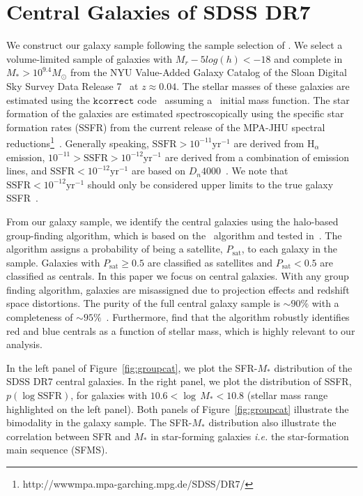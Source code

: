 \documentclass[12pt, letterpaper, preprint]{aastex}
\begin{document}
\section{Central Galaxies of SDSS DR7} \label{sec:sdss}
We construct our galaxy sample following the sample selection of \cite{tinker2011}. 
We select a volume-limited sample of galaxies with $M_r −5 log(h) < −18$ and complete in
$M_* > 10^{9.4} M_\odot$ from the NYU Value-Added Galaxy Catalog \citep[VAGC;][]{blanton2005}
of the Sloan Digital Sky Survey Data Release 7~\citep[SDSS DR7;][]{abazajian2009} at 
$z \approx 0.04$. The stellar masses of these galaxies are estimated using the
$\mathtt{kcorrect}$ code~\citep{blanton2007} assuming a~\cite{chabrier2003} initial
mass function. The star formation of the galaxies are estimated spectroscopically using the
specific star formation rates (SSFR) from the current release of the MPA-JHU spectral 
reductions\footnote{http://wwwmpa.mpa-garching.mpg.de/SDSS/DR7/}~\citep{brinchmann2004}.
Generally speaking, $\mathrm{SSFR} > 10^{-11}\mathrm{yr}^{-1}$ are derived from 
$\mathrm{H}_\alpha$ emission, $10^{-11} > \mathrm{SSFR} > 10^{-12}\mathrm{yr}^{-1}$
are derived from a combination of emission lines, and $\mathrm{SSFR} < 10^{-12}\mathrm{yr}^{-1}$
are based on $D_n 4000$~\citep[see discussion in][]{wetzel2013}. We note that 
$\mathrm{SSFR} < 10^{-12}\mathrm{yr}^{-1}$ should only be considered upper limits 
to the true galaxy SSFR~\citep{salim2007}.

From our galaxy sample, we identify the central galaxies using the \cite{tinker2011} halo-based 
group-finding algorithm, which is based on the~\cite{yang2005} algorithm and tested 
in~\cite{campbell2015}. The algorithm assigns a probability of being a satellite,
$P_\mathrm{sat}$, to each galaxy in the sample. Galaxies with $P_\mathrm{sat} \geq 0.5$ 
are classified as satellites and $P_\mathrm{sat} < 0.5$ are classified as centrals. 
In this paper we focus on central galaxies. With any group finding algorithm, galaxies are 
misassigned due to projection effects and redshift space distortions. The purity 
of the full central galaxy sample is $\sim 90\%$ with a completeness of $\sim 95\%$~\citep{tinker2017}.
Furthermore, \cite{campbell2015} find that the algorithm robustly identifies red and blue centrals
as a function of stellar mass, which is highly relevant to our analysis.  

In the left panel of Figure~\ref{fig:groupcat}, we plot the SFR-$M_*$ distribution of
the SDSS DR7 central galaxies. In the right panel, we plot the distribution of SSFR, 
$p(\log \mathrm{SSFR})$, for galaxies with $10.6 < \log \,M_* < 10.8$ (stellar mass range 
highlighted on the left panel). Both panels of Figure~\ref{fig:groupcat} illustrate the 
bimodality in the galaxy sample. The SFR-$M_*$ distribution also illustrate the correlation
between SFR and $M_*$ in star-forming galaxies \emph{i.e.} the star-formation main sequence 
(SFMS).
\end{document}
